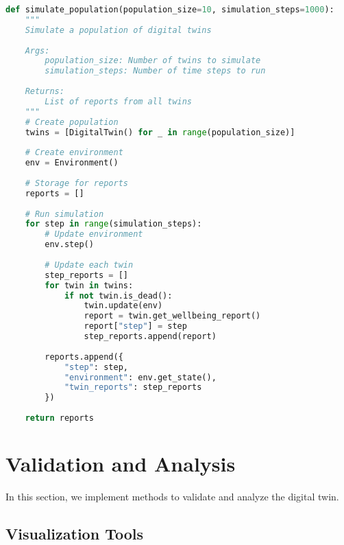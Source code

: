 \documentclass[11pt,a4paper]{article}
\begin{document}
\begin{lstlisting}[language=Python]
def simulate_population(population_size=10, simulation_steps=1000):
    """
    Simulate a population of digital twins
    
    Args:
        population_size: Number of twins to simulate
        simulation_steps: Number of time steps to run
        
    Returns:
        List of reports from all twins
    """
    # Create population
    twins = [DigitalTwin() for _ in range(population_size)]
    
    # Create environment
    env = Environment()
    
    # Storage for reports
    reports = []
    
    # Run simulation
    for step in range(simulation_steps):
        # Update environment
        env.step()
        
        # Update each twin
        step_reports = []
        for twin in twins:
            if not twin.is_dead():
                twin.update(env)
                report = twin.get_wellbeing_report()
                report["step"] = step
                step_reports.append(report)
                
        reports.append({
            "step": step,
            "environment": env.get_state(),
            "twin_reports": step_reports
        })
        
    return reports
\end{lstlisting}

\section{Validation and Analysis}
In this section, we implement methods to validate and analyze the digital twin.

\subsection{Visualization Tools}
\end{document}
